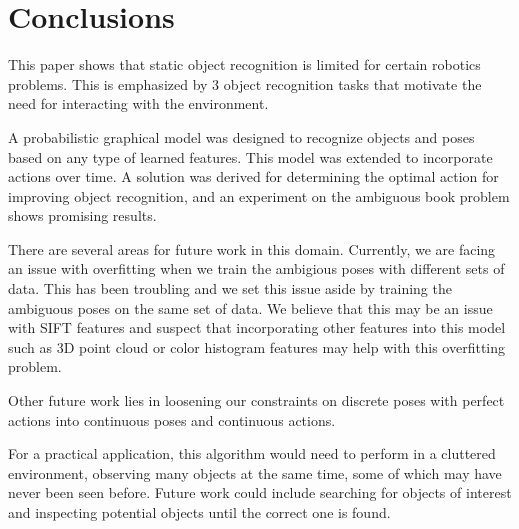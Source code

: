 \section{Conclusions}
    
    This paper shows that static object recognition is limited for certain robotics problems. This is emphasized by 3 object recognition tasks that motivate the need for interacting with the environment. 

    A probabilistic graphical model was designed to recognize objects and poses based on any type of learned features. This model was extended to incorporate actions over time. A solution was derived for determining the optimal action for improving object recognition, and an experiment on the ambiguous book problem shows promising results.

    There are several areas for future work in this domain. Currently, we are facing an issue with overfitting when we train the ambigious poses with different sets of data. This has been troubling and we set this issue aside by training the ambiguous poses on the same set of data. We believe that this may be an issue with SIFT features and suspect that incorporating other features into this model such as 3D point cloud or color histogram features may help with this overfitting problem.

    Other future work lies in loosening our constraints on discrete poses with perfect actions into continuous poses and continuous actions. %

    For a practical application, this algorithm would need to perform in a cluttered environment, observing many objects at the same time, some of which may have never been seen before. Future work could include searching for objects of interest and inspecting potential objects until the correct one is found.

